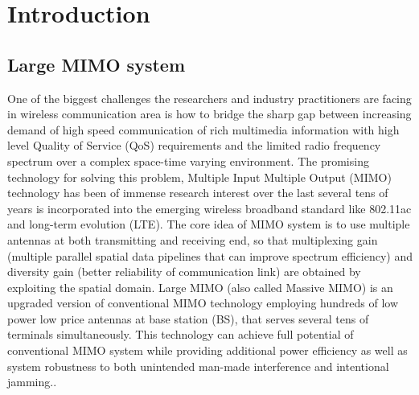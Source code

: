 \resetdatestamp







\chapter{Introduction} \label{introduction}
\section{Large MIMO system}

  One of the biggest challenges the researchers and industry practitioners are facing in wireless communication area is how to bridge the sharp gap between increasing demand of high speed communication of rich multimedia information with high level Quality of Service (QoS) requirements and the limited radio frequency spectrum over a complex space-time varying environment. The promising technology for solving this problem, Multiple Input Multiple Output (MIMO) technology has been of immense research interest over the last several tens of years is incorporated into the emerging wireless broadband standard like 802.11ac\cite{IEEE802.11ac} and long-term evolution (LTE)\cite{3GLTE}.  The core idea of MIMO system is to use multiple antennas at both transmitting and receiving end, so that multiplexing gain (multiple parallel spatial data pipelines that can improve spectrum efficiency) and diversity gain (better reliability of communication link) are obtained by exploiting the spatial domain. Large MIMO (also called Massive MIMO) is an upgraded version of conventional MIMO technology employing hundreds of low power low price antennas at base station (BS), that serves several tens of terminals simultaneously. This technology can achieve full potential of conventional MIMO system while providing additional power efficiency as well as system robustness to both unintended man-made interference and intentional jamming.\cite{rusek2013scaling}\cite{larsson2014massive}. 

